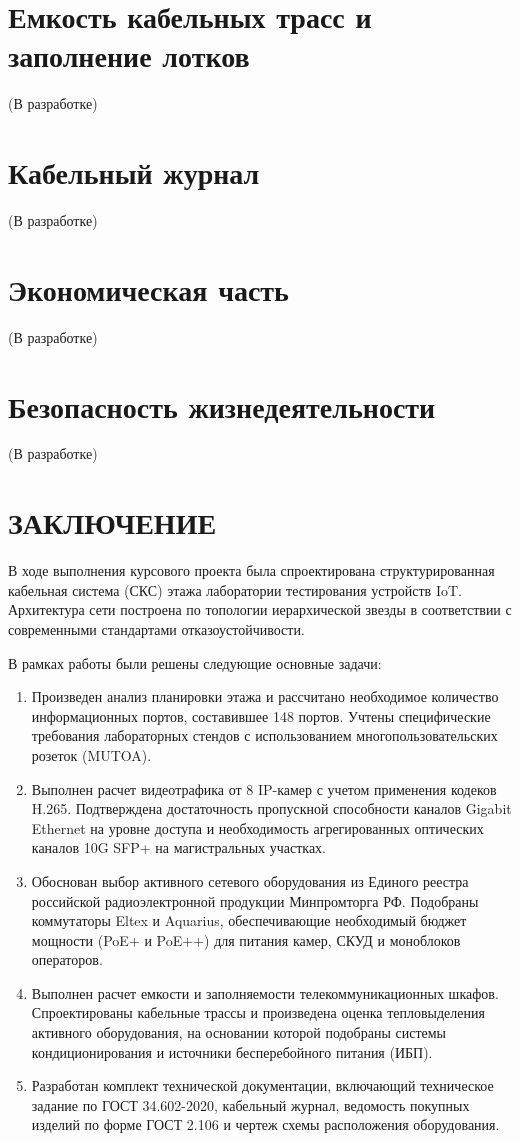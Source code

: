 \documentclass{bmstu}
\begin{document}
\chapter{Емкость кабельных трасс и заполнение лотков}
(В разработке)

\chapter{Кабельный журнал}
(В разработке)

\chapter{Экономическая часть}
(В разработке)

\chapter{Безопасность жизнедеятельности}
(В разработке)

\cleardoublepage
{}
{}
\chapter*{ЗАКЛЮЧЕНИЕ}

В ходе выполнения курсового проекта была спроектирована структурированная кабельная система (СКС) этажа лаборатории тестирования устройств IoT. Архитектура сети построена по топологии иерархической звезды в соответствии с современными стандартами отказоустойчивости.

В рамках работы были решены следующие основные задачи:
\begin{enumerate}
    \item Произведен анализ планировки этажа и рассчитано необходимое количество информационных портов, составившее 148 портов. Учтены специфические требования лабораторных стендов с использованием многопользовательских розеток (MUTOA).
    \item Выполнен расчет видеотрафика от 8 IP-камер с учетом применения кодеков H.265. Подтверждена достаточность пропускной способности каналов Gigabit Ethernet на уровне доступа и необходимость агрегированных оптических каналов 10G SFP+ на магистральных участках.
    \item Обоснован выбор активного сетевого оборудования из Единого реестра российской радиоэлектронной продукции Минпромторга РФ. Подобраны коммутаторы Eltex и Aquarius, обеспечивающие необходимый бюджет мощности (PoE+ и PoE++) для питания камер, СКУД и моноблоков операторов.
    \item Выполнен расчет емкости и заполняемости телекоммуникационных шкафов. Спроектированы кабельные трассы и произведена оценка тепловыделения активного оборудования, на основании которой подобраны системы кондиционирования и источники бесперебойного питания (ИБП).
    \item Разработан комплект технической документации, включающий техническое задание по ГОСТ 34.602-2020, кабельный журнал, ведомость покупных изделий по форме ГОСТ 2.106 и чертеж схемы расположения оборудования.
\end{enumerate}
\end{document}
